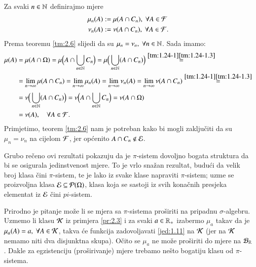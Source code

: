 \begin{rj}[\ref{zad:2.9}]
    Za svaki $n \in \mathbb{N}$ definirajmo mjere
    \begin{equation*}
        \begin{aligned}
            \mu_n (A) &:= \mu (A \cap C_n), \; \forall A \in \mathcal{F}\\
            \nu_n (A) &:= \nu (A \cap C_n), \; \forall A \in \mathcal{F}.
        \end{aligned}
    \end{equation*}
    Prema teoremu \ref{tm:2.6} slijedi da su $\mu_n = \nu_n, \; \forall n \in \mathbb{N}$. Sada imamo:
    \begin{equation*}
        \begin{aligned}
            \mu (A) &= \mu (A \cap \Omega) = \mu \Big( A \cap \bigcup\limits_{n \in \mathbb{N}}^{} C_n \Big) = \mu \Big( \bigcup\limits_{n \in \mathbb{N}}^{} (A \cap C_n) \Big) \overset{\ref{tm:1.24-1} \ref{tm:1.24-1.3}}{=}\\
            &= \lim\limits_{n \to \infty} \mu(A \cap C_n) = \lim\limits_{n \to \infty} \mu_n (A) = \lim\limits_{n \to \infty} \nu_n (A) = \lim\limits_{n \to \infty} \nu (A \cap C_n) \overset{\ref{tm:1.24-1} \ref{tm:1.24-1.3}}{=}\\
            &= \nu \Big( \bigcup\limits_{n \in \mathbb{N}}^{} (A \cap C_n) \Big) = \nu \Big( A \cap \bigcup\limits_{n \in \mathbb{N}}^{} C_n \Big) = \nu(A \cap \Omega)\\
            &= \nu(A), \quad \forall A \in \mathcal{F}.
        \end{aligned}
    \end{equation*}
    Primjetimo, teorem \ref{tm:2.6} nam je potreban kako bi mogli zaklju\v citi da su $\mu_n = \nu_n$ na cijelom $\mathcal{F}$, jer op\' cenito $A \cap C_n \notin \mathcal{E}$.
\end{rj}

\begin{nap} \label{nap:2.10}
    Grubo re\v ceno ovi rezultati pokazuju da je $\pi$-sistem dovoljno bogata struktura da bi se osigurala jedinstvenost mjere.
    To je vrlo sna\v zan rezultat, budu\' ci da velik broj klasa \v cini $\pi$-sistem, te je lako iz svake klase napraviti $\pi$-sistem; uzme se proizvoljna klasa $\mathcal{E} \subseteq \mathcal{P}({\Omega})$, klasa koja se sastoji iz svih kona\v cnih presjeka elementat iz $\mathcal{E}$ \v cini $pi$-sistem.

    Prirodno je pitanje mo\v ze li se mjera sa $\pi$-sistema pro\v siriti na pripadnu $\sigma$-algebru.
    Uzmemo li klasu $\mathcal{K}$ iz primjera \ref{pr:2.3} i za svaki $a \in \mathbb{R}_+$ izabermo $\mu_a$ takav da je $\mu_a(A) = a, \; \forall A \in \mathcal{K}$, takva \' ce funkcija zadovoljavati \eqref{jed:1.11} na $\mathcal{K}$ (jer na $\mathcal{K}$ nemamo niti dva disjunktna skupa).
    O\v cito se $\mu_a$ ne mo\v ze pro\v siriti do mjere na $\mathcal{B}_{\mathbb{R}}$.
    Dakle za egzistenciju  (pro\v sirivanje) mjere trebamo ne\v sto bogatiju klasu od $\pi$-sistema.
\end{nap}

